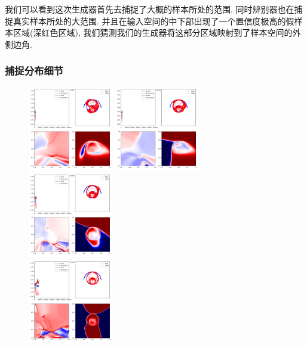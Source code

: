 \documentclass[lang=cn,11pt]{elegantpaper}
\begin{document}
我们可以看到这次生成器首先去捕捉了大概的样本所处的范围. 同时辨别器也在捕捉真实样本所处的大范围. 并且在输入空间的中下部出现了一个置信度极高的假样本区域(深红色区域), 我们猜测我们的生成器将这部分区域映射到了样本空间的外侧边角.

\subsubsection{捕捉分布细节}

\begin{figure}[hbt]
  \includegraphics[width=0.33\textwidth]{wings_3_1}
  \includegraphics[width=0.33\textwidth]{wings_3_2}
  \includegraphics[width=0.33\textwidth]{wings_3_3}\\
  \includegraphics[width=0.33\textwidth]{wings_3_4}

\end{figure}
\end{document}
